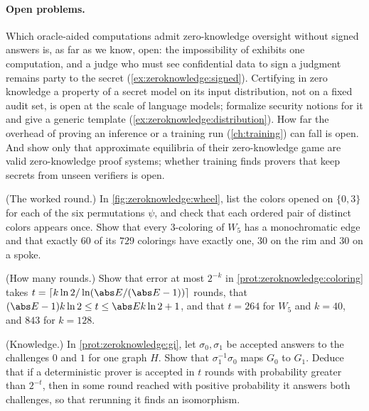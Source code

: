 \begin{refsection}
\paragraph{Open problems.} Which oracle-aided computations admit zero-knowledge oversight without signed answers is, as far as we know, open: the impossibility of \textcite{ChiesaGuanYildiz2026} exhibits one computation, and a judge who must see confidential data to sign a judgment remains party to the secret (\cref{ex:zeroknowledge:signed}). Certifying in zero knowledge a property of a secret model on its input distribution, not on a fixed audit set, is open at the scale of language models; \textcite{LuckEtAl2026} formalize security notions for it and give a generic template (\cref{ex:zeroknowledge:distribution}). How far the overhead of proving an inference or a training run (\cref{ch:training}) can fall is open. And \textcite[Theorem~12]{HammondAdamDay2025} show only that approximate equilibria of their zero-knowledge game are valid zero-knowledge proof systems; whether training finds provers that keep secrets from unseen verifiers is open.

\begin{exercises}
\item \consolidation (The worked round.) In \cref{fig:zeroknowledge:wheel}, list the colors opened on $\{0,3\}$ for each of the six permutations $\psi$, and check that each ordered pair of distinct colors appears once. Show that every 3-coloring of $W_5$ has a monochromatic edge and that exactly $60$ of its $729$ colorings have exactly one, $30$ on the rim and $30$ on a spoke.\label{ex:zeroknowledge:byhand}

\item \consolidation (How many rounds.) Show that error at most $2^{-k}$ in \cref{prot:zeroknowledge:coloring} takes $t=\lceil k\ln2/\ln(\abs E/(\abs E-1))\rceil$ rounds, that $(\abs E-1)k\ln2\le t\le\abs Ek\ln2+1$, and that $t=264$ for $W_5$ and $k=40$, and $843$ for $k=128$.\label{ex:zeroknowledge:rounds}

\item \consolidation (Knowledge.) In \cref{prot:zeroknowledge:gi}, let $\sigma_0,\sigma_1$ be accepted answers to the challenges $0$ and $1$ for one graph $H$. Show that $\sigma_1^{-1}\sigma_0$ maps $G_0$ to $G_1$. Deduce that if a deterministic prover is accepted in $t$ rounds with probability greater than $2^{-t}$, then in some round reached with positive probability it answers both challenges, so that rerunning it finds an isomorphism.\label{ex:zeroknowledge:knowledge}


\end{exercises}
\end{refsection}
